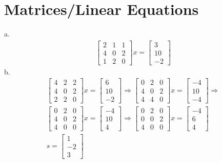 \documentclass[paper=a4, fontsize=11pt]{scrartcl} %
\begin{document}
\section{Matrices/Linear Equations}
a.
    \[
        \begin{split}
\begin{bmatrix}
2 & 1 & 1\\ 
4 & 0 & 2\\ 
1 & 2 & 0
\end{bmatrix} x
=
 \begin{bmatrix}
3\\ 
10\\ 
-2
\end{bmatrix}
        \end{split}
    \]
b.
    \[
        \begin{split}
\begin{bmatrix}
4 & 2 & 2\\ 
4 & 0 & 2\\ 
2 & 2 & 0
\end{bmatrix} x
=
 \begin{bmatrix}
6\\ 
10\\ 
-2
\end{bmatrix}
\Rightarrow 
\begin{bmatrix}
0 & 2 & 0\\ 
4 & 0 & 2\\ 
4 & 4 & 0
\end{bmatrix} x
=
 \begin{bmatrix}
-4\\ 
10\\ 
-4
\end{bmatrix}
\Rightarrow\\
\begin{bmatrix}
0 & 2 & 0\\ 
4 & 0 & 2\\ 
4 & 0 & 0
\end{bmatrix} x
=
 \begin{bmatrix}
-4\\ 
10\\ 
4
\end{bmatrix}
\Rightarrow 
\begin{bmatrix}
0 & 2 & 0\\ 
0 & 0 & 2\\ 
4 & 0 & 0
\end{bmatrix} x
=
 \begin{bmatrix}
-4\\ 
6\\ 
4
\end{bmatrix}\\
s =
 \begin{bmatrix}
1\\ 
-2\\ 
3
\end{bmatrix}
        \end{split}
    \]
    
\end{document}
